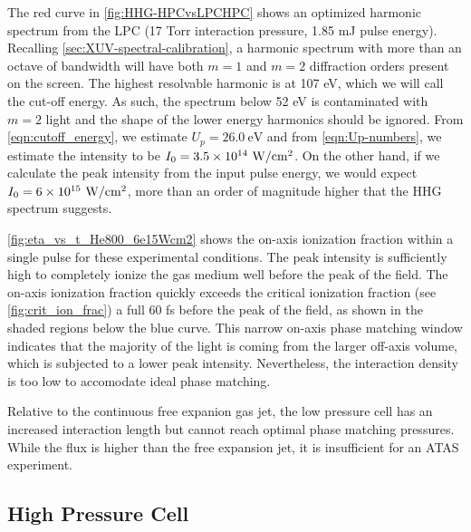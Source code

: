 The red curve in \cref{fig:HHG-HPCvsLPCHPC} shows an optimized harmonic spectrum from the LPC (17 Torr interaction pressure, 1.85 mJ pulse energy). Recalling \cref{sec:XUV-spectral-calibration}, a harmonic spectrum with more than an octave of bandwidth will have both $m=1$ and $m=2$ diffraction orders present on the screen. The highest resolvable harmonic is at 107 eV, which we will call the cut-off energy. As such, the spectrum below 52 eV is contaminated with ${m=2}$ light and the shape of the lower energy harmonics should be ignored. From \cref{eqn:cutoff_energy}, we estimate $U_p = 26.0 \ \textrm{eV}$ and from \cref{eqn:Up-numbers}, we estimate the intensity to be ${I_0 = 3.5 \times 10^{14} \ \textrm{W/cm\textsuperscript{2}}}$. On the other hand, if we calculate the peak intensity from the input pulse energy, we would expect ${I_0 = 6 \times 10^{15} \textrm{ W/cm\textsuperscript{2}}}$, more than an order of magnitude higher that the HHG spectrum suggests.

\cref{fig:eta_vs_t_He800_6e15Wcm2} shows the on-axis ionization fraction within a single pulse for these experimental conditions. The peak intensity is sufficiently high to completely ionize the gas medium well before the peak of the field. The on-axis ionization fraction quickly exceeds the critical ionization fraction (see \cref{fig:crit_ion_frac}) a full 60 fs before the peak of the field, as shown in the shaded regions below the blue curve. This narrow on-axis phase matching window indicates that the majority of the light is coming from the larger off-axis volume, which is subjected to a lower peak intensity. Nevertheless, the interaction density is too low to accomodate ideal phase matching.

Relative to the continuous free expanion gas jet, the low pressure cell has an increased interaction length but cannot reach optimal phase matching pressures. While the flux is higher than the free expansion jet, it is insufficient for an ATAS experiment.

\subsection{High Pressure Cell}
\label{sec:HPC}

